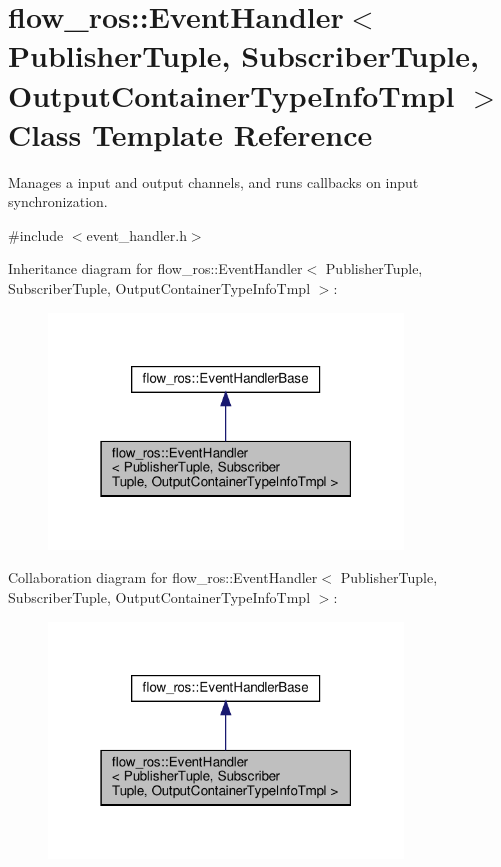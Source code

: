 \hypertarget{classflow__ros_1_1_event_handler}{}\section{flow\+\_\+ros\+:\+:Event\+Handler$<$ Publisher\+Tuple, Subscriber\+Tuple, Output\+Container\+Type\+Info\+Tmpl $>$ Class Template Reference}
\label{classflow__ros_1_1_event_handler}


Manages a input and output channels, and runs callbacks on input synchronization.  




{\ttfamily \#include $<$event\+\_\+handler.\+h$>$}



Inheritance diagram for flow\+\_\+ros\+:\+:Event\+Handler$<$ Publisher\+Tuple, Subscriber\+Tuple, Output\+Container\+Type\+Info\+Tmpl $>$\+:\nopagebreak
\begin{figure}[H]
\begin{center}
\leavevmode
\includegraphics[width=267pt]{classflow__ros_1_1_event_handler__inherit__graph}
\end{center}
\end{figure}


Collaboration diagram for flow\+\_\+ros\+:\+:Event\+Handler$<$ Publisher\+Tuple, Subscriber\+Tuple, Output\+Container\+Type\+Info\+Tmpl $>$\+:\nopagebreak
\begin{figure}[H]
\begin{center}
\leavevmode
\includegraphics[width=267pt]{classflow__ros_1_1_event_handler__coll__graph}
\end{center}
\end{figure}
